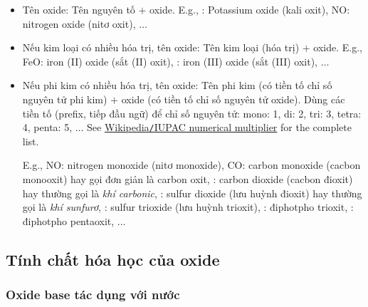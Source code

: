 \documentclass{article}
\begin{document}
\begin{itemize}
	\item Tên oxide: Tên nguyên tố $+$ oxide. E.g., : Potassium oxide (kali oxit), NO: nitrogen oxide (nitơ oxit), $\ldots$
	\item Nếu kim loại có nhiều hóa trị, tên oxide: Tên kim loại (hóa trị) $+$ oxide. E.g., FeO: iron (II) oxide (sắt (II) oxit), : iron (III) oxide (sắt (III) oxit), $\ldots$
	\item Nếu phi kim có nhiều hóa trị, tên oxide: Tên phi kim (có tiền tố chỉ số nguyên tử phi kim) $+$ oxide (có tiền tố chỉ số nguyên tử oxide). Dùng các tiền tố (prefix, tiếp đầu ngữ) để chỉ số nguyên tử: mono: 1, di: 2, tri: 3, tetra: 4, penta: 5, $\ldots$ See \href{https://en.wikipedia.org/wiki/IUPAC_numerical_multiplier}{Wikipedia{\tt/}IUPAC numerical multiplier} for the complete list.
	
	E.g., NO: nitrogen monoxide (nitơ monoxide), CO: carbon monoxide (cacbon monooxit) hay gọi đơn giản là carbon oxit, : carbon dioxide (cacbon đioxit) hay thường gọi là \textit{khí carbonic}, : sulfur dioxide (lưu huỳnh đioxit) hay thường gọi là \textit{khí sunfurơ}, : sulfur trioxide (lưu huỳnh trioxit), : điphotpho trioxit, : điphotpho pentaoxit, $\ldots$
\end{itemize}

\subsection{Tính chất hóa học của oxide}

\subsubsection{Oxide base tác dụng với nước}
\end{document}
